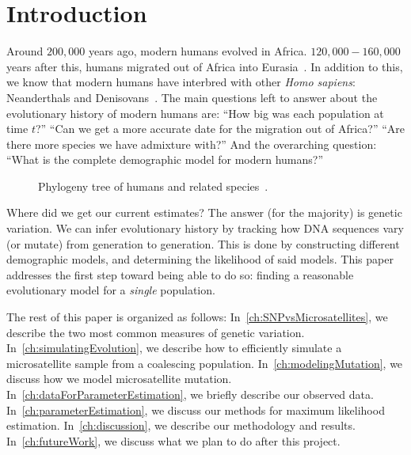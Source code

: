 \chapter{Introduction}\label{ch:introduction}
Around $200,000$ years ago, modern humans evolved in Africa.
$120,000-160,000$ years after this, humans migrated out of Africa into
Eurasia~\cite{campbellEvolutionHumanGenetic2010}.
In addition to this, we know that modern humans have interbred with other \textit{Homo sapiens}: Neanderthals and
Denisovans~\cite{sankararamanCombinedLandscapeDenisovan2016}.
The main questions left to answer about the evolutionary history of modern humans are:
``How big was each population at time $t$?''
``Can we get a more accurate date for the migration out of Africa?''
``Are there more species we have admixture with?''
And the overarching question: ``What is the complete demographic model for modern humans?''
\begin{figure}[th]
    \caption{
    Phylogeny tree of humans and related species~\cite{riceReview18Organic}.
    }\label{fig:overviewEvolution}
\end{figure}

Where did we get our current estimates?
The answer (for the majority) is genetic variation.
We can infer evolutionary history by tracking how DNA sequences vary (or mutate) from generation to generation.
This is done by constructing different demographic models, and determining the likelihood of said models.
This paper addresses the first step toward being able to do so: finding a reasonable evolutionary model for a
\emph{single} population.

The rest of this paper is organized as follows:
In~\autoref{ch:SNPvsMicrosatellites}, we describe the two most common measures of genetic variation.
In~\autoref{ch:simulatingEvolution}, we describe how to efficiently simulate a microsatellite sample from a coalescing
population.
In~\autoref{ch:modelingMutation}, we discuss how we model microsatellite mutation.
In~\autoref{ch:dataForParameterEstimation}, we briefly describe our observed data.
In~\autoref{ch:parameterEstimation}, we discuss our methods for maximum likelihood estimation.
In~\autoref{ch:discussion}, we describe our methodology and results.
In~\autoref{ch:futureWork}, we discuss what we plan to do after this project.
